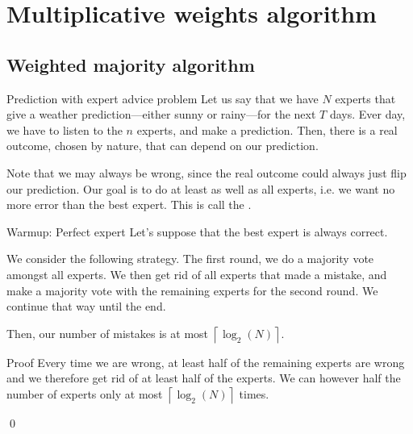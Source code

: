 \documentclass[a4paper]{article}
\begin{document}
\section{Multiplicative weights algorithm}
\subsection{Weighted majority algorithm}


\begin{parag}{Prediction with expert advice problem}
    Let us say that we have $N$ experts that give a weather prediction---either sunny or rainy---for the next $T$ days. Ever day, we have to listen to the $n$ experts, and make a prediction. Then, there is a real outcome, chosen by nature, that can depend on our prediction. 

    Note that we may always be wrong, since the real outcome could always just flip our prediction. Our goal is to do at least as well as all experts, i.e. we want no more error than the best expert. This is call the .
\end{parag}

\begin{parag}{Warmup: Perfect expert}
    Let's suppose that the best expert is always correct. 

    We consider the following strategy. The first round, we do a majority vote amongst all experts. We then get rid of all experts that made a mistake, and make a majority vote with the remaining experts for the second round. We continue that way until the end.

    Then, our number of mistakes is at most $\left\lceil \log_2\left(N\right) \right\rceil $.

    \begin{subparag}{Proof}
        Every time we are wrong, at least half of the remaining experts are wrong and we therefore get rid of at least half of the experts. We can however half the number of experts only at most $\left\lceil \log_2\left(N\right) \right\rceil $ times.

        \qed
    \end{subparag}
\end{parag}
\end{document}
